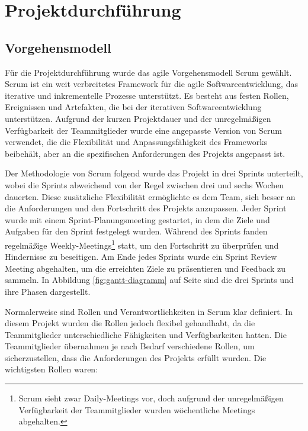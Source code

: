 
\section{Projektdurchführung}\label{projektdurchfuehrung}

\subsection{Vorgehensmodell}\label{vorgehensmodell}

Für die Projektdurchführung wurde das agile Vorgehensmodell \gls{Scrum} gewählt. Scrum ist ein weit verbreitetes Framework für die agile Softwareentwicklung, das iterative und inkrementelle Prozesse unterstützt. Es besteht aus festen Rollen, Ereignissen und Artefakten, die bei der iterativen Softwareentwicklung unterstützen. Aufgrund der kurzen Projektdauer und der unregelmäßigen Verfügbarkeit der Teammitglieder wurde eine angepasste Version von Scrum verwendet, die die Flexibilität und Anpassungsfähigkeit des Frameworks beibehält, aber an die spezifischen Anforderungen des Projekts angepasst ist.

Der Methodologie von Scrum folgend wurde das Projekt in drei Sprints unterteilt, wobei die Sprints abweichend von der Regel zwischen drei und sechs Wochen dauerten. Diese zusätzliche Flexibilität ermöglichte es dem Team, sich besser an die Anforderungen und den Fortschritt des Projekts anzupassen. Jeder Sprint wurde mit einem Sprint-Planungsmeeting gestartet, in dem die Ziele und Aufgaben für den Sprint festgelegt wurden. Während des Sprints fanden regelmäßige Weekly-Meetings\footnote{Scrum sieht zwar Daily-Meetings vor, doch aufgrund der unregelmäßigen Verfügbarkeit der Teammitglieder wurden wöchentliche Meetings abgehalten.} statt, um den Fortschritt zu überprüfen und Hindernisse zu beseitigen. Am Ende jedes Sprints wurde ein Sprint Review Meeting abgehalten, um die erreichten Ziele zu präsentieren und Feedback zu sammeln. In Abbildung \ref{fig:gantt-diagramm} auf Seite \pageref{fig:gantt-diagramm} sind die drei Sprints und ihre Phasen dargestellt.

Normalerweise sind Rollen und Verantwortlichkeiten in Scrum klar definiert. In diesem Projekt wurden die Rollen jedoch flexibel gehandhabt, da die Teammitglieder unterschiedliche Fähigkeiten und Verfügbarkeiten hatten. Die Teammitglieder übernahmen je nach Bedarf verschiedene Rollen, um sicherzustellen, dass die Anforderungen des Projekts erfüllt wurden. Die wichtigsten Rollen waren:

